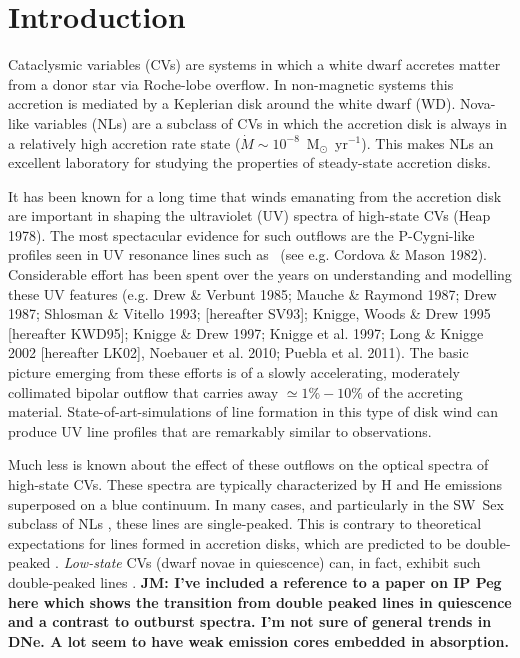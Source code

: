 \documentclass[preprint, a4paper, 11pt]{aastex}
\begin{document}
\section{Introduction} 
\label{sec:intro}

Cataclysmic variables (CVs) are systems in which a white dwarf
accretes matter from a donor star via Roche-lobe overflow. In
non-magnetic systems this accretion is mediated by a Keplerian disk
around the white dwarf (WD). Nova-like variables (NLs) are a subclass
of CVs in which the accretion disk is always in a relatively
high accretion rate state ($\dot{M} \sim
10^{-8}$~M$_{\odot}$~yr$^{-1}$).  This makes NLs an excellent
laboratory for studying the properties of steady-state accretion
disks.

It has been known for a long time that winds emanating from the
accretion disk are important in shaping the ultraviolet (UV) spectra
of high-state CVs (Heap 1978). The most spectacular evidence for such
outflows are the P-Cygni-like profiles seen in UV resonance lines such as
\civfull\ (see e.g. Cordova \& Mason
1982\nocite{cordova1982}). Considerable effort has been spent over the
years on understanding and modelling these UV features (e.g. Drew \&
Verbunt 1985\nocite{drewverbunt1985}; Mauche \& Raymond
1987\nocite{maucheraymond1987}; Drew 1987; Shlosman \& Vitello 1993; [hereafter
SV93]\nocite{SV93}; Knigge, Woods \& Drew 1995 [hereafter
KWD95]\nocite{KWD95}; Knigge \& Drew 1997\nocite{kd1997}; 
Knigge et al. 1997\nocite{knigge1997}; Long \&
Knigge 2002 [hereafter LK02]\nocite{LK02}, Noebauer et al. 2010;
Puebla et al. 2011\nocite{puebla2011}). The basic picture emerging from these efforts is
of a slowly accelerating, moderately collimated bipolar
outflow that carries away $\simeq 1\% - 10\%$ of the accreting
material. State-of-art-simulations of line formation in this type
of disk wind can produce UV line profiles that are remarkably similar
to observations.

Much less is known about the effect of these outflows on the optical
spectra of high-state CVs. These spectra are typically characterized
by H and He emissions superposed on a blue continuum. In many
cases, and particularly in the SW~Sex subclass of NLs
\citep{HSK86,DR95}, these lines are single-peaked. This is contrary to
theoretical expectations for lines formed in accretion disks, which
are predicted to be double-peaked \citep{smak1981, hornemarsh1986}. 
{\em Low-state} CVs (dwarf novae in quiescence) can, in fact,
exhibit such double-peaked lines \citep{marshhorne1990}. 
{\bf JM: I've included a reference to a paper on IP Peg here
which shows the transition from double peaked lines in 
quiescence and a contrast to outburst spectra. I'm not sure
of general trends in DNe. A lot seem to have weak emission cores
embedded in absorption.}
\end{document}
